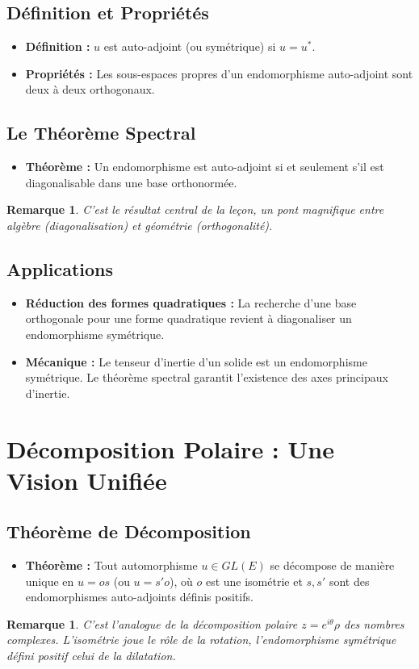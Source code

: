 \documentclass[12pt, a4paper, parskip=full]{report}
\theoremstyle{agregstyle}
\newtheorem{remark}[definition]{Remarque}
\begin{document}
\subsection{Définition et Propriétés}
\begin{itemize}
    \item \textbf{Définition :} $u$ est auto-adjoint (ou symétrique) si $u=u^*$.
    \item \textbf{Propriétés :} Les sous-espaces propres d'un endomorphisme auto-adjoint sont deux à deux orthogonaux.
\end{itemize}
\subsection{Le Théorème Spectral}
\begin{itemize}
    \item \textbf{Théorème :} Un endomorphisme est auto-adjoint si et seulement s'il est diagonalisable dans une base orthonormée.
\end{itemize}
\begin{remark}
    C'est le résultat central de la leçon, un pont magnifique entre algèbre (diagonalisation) et géométrie (orthogonalité).
\end{remark}
\subsection{Applications}
\begin{itemize}
    \item \textbf{Réduction des formes quadratiques :} La recherche d'une base orthogonale pour une forme quadratique revient à diagonaliser un endomorphisme symétrique.
    \item \textbf{Mécanique :} Le tenseur d'inertie d'un solide est un endomorphisme symétrique. Le théorème spectral garantit l'existence des axes principaux d'inertie.
\end{itemize}

\section{Décomposition Polaire : Une Vision Unifiée}
\subsection{Théorème de Décomposition}
\begin{itemize}
    \item \textbf{Théorème :} Tout automorphisme $u \in GL(E)$ se décompose de manière unique en $u=os$ (ou $u=s'o$), où $o$ est une isométrie et $s, s'$ sont des endomorphismes auto-adjoints définis positifs.
\end{itemize}
\begin{remark}
    C'est l'analogue de la décomposition polaire $z = e^{i\theta} \rho$ des nombres complexes. L'isométrie joue le rôle de la rotation, l'endomorphisme symétrique défini positif celui de la dilatation.
\end{remark}
\end{document}
